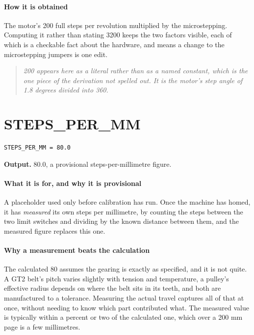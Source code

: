 \paragraph{How it is obtained}
The motor's 200 full steps per revolution multiplied by the microstepping. Computing it rather than stating 3200 keeps the two factors visible, each of which is a checkable fact about the hardware, and means a change to the microstepping jumpers is one edit.


\begin{quote}\small\itshape 200 appears here as a literal rather than as a named constant, which is the one piece of the derivation not spelled out. It is the motor's step angle of 1.8 degrees divided into 360.\end{quote}

\section{STEPS\_PER\_MM}
\begin{lstlisting}[style=sig]
STEPS_PER_MM = 80.0
\end{lstlisting}

\noindent\textbf{Output.} 80.0, a provisional steps-per-millimetre figure.


\paragraph{What it is for, and why it is provisional}
A placeholder used only before calibration has run. Once the machine has homed, it has \emph{measured} its own steps per millimetre, by counting the steps between the two limit switches and dividing by the known distance between them, and the measured figure replaces this one.


\paragraph{Why a measurement beats the calculation}
The calculated 80 assumes the gearing is exactly as specified, and it is not quite. A GT2 belt's pitch varies slightly with tension and temperature, a pulley's effective radius depends on where the belt sits in its teeth, and both are manufactured to a tolerance. Measuring the actual travel captures all of that at once, without needing to know which part contributed what. The measured value is typically within a percent or two of the calculated one, which over a 200 mm page is a few millimetres.


